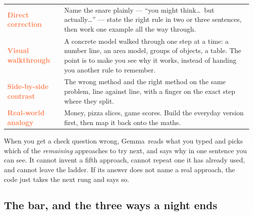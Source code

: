 \documentclass[11pt]{article}
\newcommand{\themodel}{Gemma}
\begin{document}
\vspace{0.3em}
\begin{center}
\begin{tabularx}{0.97\textwidth}{@{}>{\sffamily\bfseries}L{34mm} X@{}}
\toprule
\textcolor{Coral}{Direct correction} & Name the snare plainly --- ``you might think\ldots\ but
actually\ldots'' --- state the right rule in two or three sentences, then work
one example all the way through.\\
\addlinespace[0.3em]
\textcolor{Coral}{Visual walkthrough} & A concrete model walked through one step at a time: a
number line, an area model, groups of objects, a table. The point is to make you
see why it works, instead of handing you another rule to remember.\\
\addlinespace[0.3em]
\textcolor{Coral}{Side-by-side contrast} & The wrong method and the right method on the same
problem, line against line, with a finger on the exact step where they split.\\
\addlinespace[0.3em]
\textcolor{Coral}{Real-world analogy} & Money, pizza slices, game scores. Build the everyday
version first, then map it back onto the maths.\\
\bottomrule
\end{tabularx}
\end{center}

\vspace{0.3em}
When you get a check question wrong, \themodel\ reads what you typed and picks
which of the \emph{remaining} approaches to try next, and says why in one
sentence you can see. It cannot invent a fifth approach, cannot repeat one it
has already used, and cannot leave the ladder. If its answer does not name a
real approach, the code just takes the next rung and says so.

\subsection{The bar, and the three ways a night ends}
\end{document}
